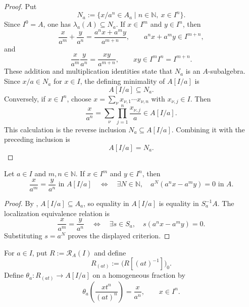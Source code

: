 \begin{proof}
  Put
  \[
    N_a:=\{x/a^n\in A_a\mid n\in\mathbb N,\ x\in I^n\}.
  \]
  Since $I^0=A$, one has $\lambda_a(A)\subseteq N_a$.  If
  $x\in I^m$ and $y\in I^n$, then
  \[
    \frac{x}{a^m}+\frac{y}{a^n}
      =\frac{a^nx+a^my}{a^{m+n}},
    \qquad a^nx+a^my\in I^{m+n},
  \]
  and
  \[
    \frac{x}{a^m}\frac{y}{a^n}
      =\frac{xy}{a^{m+n}},
    \qquad xy\in I^mI^n=I^{m+n}.
  \]
  These addition and multiplication identities state that $N_a$ is an
  $A$-subalgebra.  Since $x/a\in N_a$ for $x\in I$, the defining minimality
  of $A[I/a]$ is
  \[
    A[I/a]\subseteq N_a.
  \]
  Conversely, if $x\in I^n$, choose
  $x=\sum_\nu x_{\nu,1}\cdots x_{\nu,n}$ with $x_{\nu,j}\in I$.  Then
  \[
    \frac{x}{a^n}
      =\sum_\nu\prod_{j=1}^n\frac{x_{\nu,j}}a\in A[I/a].
  \]
  This calculation is the reverse inclusion
  $N_a\subseteq A[I/a]$.  Combining it with the preceding inclusion is
  \[
    A[I/a]=N_a.
  \]
\end{proof}

\begin{lemma}
  \label{lemma:nagata-chart-ring-fraction-equality}

  Let $a\in I$ and $m,n\in\mathbb N$.  If $x\in I^m$ and $y\in I^n$, then
  \[
    \frac{x}{a^m}=\frac{y}{a^n}\text{ in }A[I/a]
    \quad\Longleftrightarrow\quad
    \exists N\in\mathbb N,\quad
      a^N(a^nx-a^my)=0\text{ in }A.
  \]
\end{lemma}

\begin{proof}
  By , $A[I/a]\subseteq A_a$, so equality
  in $A[I/a]$ is equality in $S_a^{-1}A$.  The localization equivalence
  relation is
  \[
    \frac{x}{a^m}=\frac{y}{a^n}
    \quad\Longleftrightarrow\quad
    \exists s\in S_a,\quad s(a^nx-a^my)=0.
  \]
  Substituting $s=a^N$ proves the displayed criterion.
\end{proof}

\begin{definition}
  \label{def:nagata-homogeneous-away-to-chart}

  For $a\in I$, put $R:=\mathcal R_A(I)$ and define
  \[
    R_{(at)}:=\bigl(R[(at)^{-1}]\bigr)_0.
  \]
  Define $\theta_a\colon R_{(at)}\to A[I/a]$ on a homogeneous fraction by
  \[
    \theta_a\!\left(\frac{xt^n}{(at)^n}\right)=\frac{x}{a^n},
    \qquad x\in I^n.
  \]
\end{definition}

